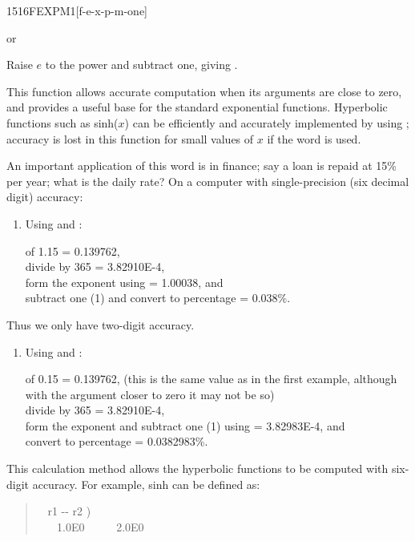 \vspace*{-1ex}
\begin{worddef}{1516}{FEXPM1}[f-e-x-p-m-one]
\item {} or

	Raise $e$ to the power  and subtract one, giving .

	\begin{rationale} %
		This function allows accurate computation when its arguments
		are close to zero, and provides a useful base for the standard
		exponential functions. Hyperbolic functions such as
		\textsf{sinh($x$)} can be efficiently and accurately
		implemented by using ; accuracy is lost in this
		function for small values of $x$ if the word  is
		used.

		An important application of this word is in finance; say a loan
		is repaid at 15\% per year; what is the daily rate? On a computer
		with single-precision (six decimal digit) accuracy:

		\begin{enumerate}
		\item[1.] Using  and :

			 of 1.15 = 0.139762, \\
			divide by 365 = 3.82910E-4, \\
			form the exponent using  = 1.00038, and \\
			subtract one (1) and convert to percentage = 0.038\%.
		\end{enumerate}
		Thus we only have two-digit accuracy.
		\begin{enumerate}
		\item[2.] Using  and :

			 of 0.15 = 0.139762, (this is the same value
			as in the first example, although with the argument closer
			to zero it may not be so) \\
			divide by 365 = 3.82910E-4, \\
			form the exponent and subtract one (1) using
			 = 3.82983E-4, and \\
			convert to percentage = 0.0382983\%.
		\end{enumerate}
		This calculation method allows the hyperbolic functions to be
		computed with six-digit accuracy. For example, \textsf{sinh}
		can be defined as:

		\begin{quote}\ttfamily
			\word[core]{:} ~  r1 -{}- r2 ) \\
			\tab {}~ ~
				  1.0E0 \word{F+}~ ~ ~
				 2.0E0 
			\word[core]{;}
		\end{quote}
	\end{rationale}
\end{worddef}

